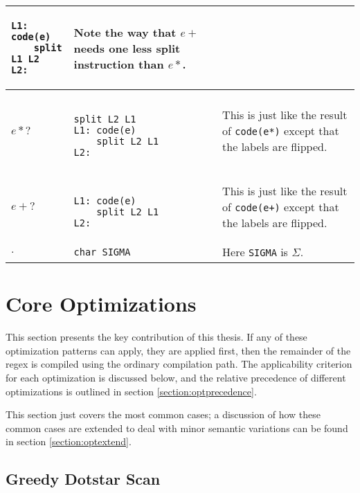 \begin{table}[ht]
\begin{tabular}{| l | l | p{8cm} |}
\begin{minipage}{3cm}
\begin{verbatim}
L1: code(e)
    split L1 L2
L2: 
  \end{verbatim}
  \end{minipage}
  & Note the way that $e+$ needs one less split instruction than $e*$. \\ \hline
$e*?$ &
  \begin{minipage}{3cm}
  \begin{verbatim}

split L2 L1
L1: code(e)
    split L2 L1
L2: 
  \end{verbatim}
  \end{minipage}
  & This is just like the result of \verb'code(e*)' except that the
    labels are flipped. \\ \hline
$e+?$ &
  \begin{minipage}{3cm}
  \begin{verbatim}

L1: code(e)
    split L2 L1
L2: 
  \end{verbatim}
  \end{minipage}
  & This is just like the result of \verb'code(e+)' except that the
    labels are flipped. \\ \hline
$.$ & \verb'char SIGMA' & Here \verb'SIGMA' is $\Sigma$. \\ \hline
\end{tabular}
\end{table}

\section{Core Optimizations}
\label{section:skipscanopt}

This section presents the key contribution of this thesis. If any of
these optimization patterns can apply, they are applied first, then
the remainder of the regex is compiled using the ordinary compilation
path. The applicability criterion for each optimization is discussed
below, and the relative precedence of different optimizations is
outlined in section \ref{section:optprecedence}.

 This section just covers the most common cases; a discussion of
how these common cases are extended to deal with minor semantic
variations can be found in section \ref{section:optextend}.

\subsection{Greedy Dotstar Scan}

